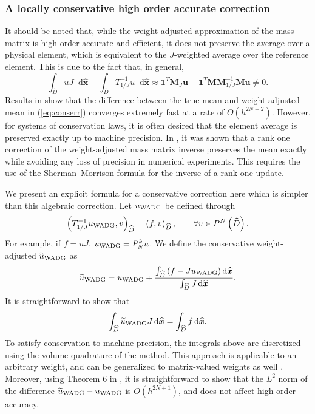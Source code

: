 \documentclass[preprint,10pt]{article}
\theoremstyle{definition}
\theoremstyle{lemma}
\theoremstyle{theorem}
\theoremstyle{assumption}
\renewcommand{\hat}{\widehat}
\renewcommand{\tilde}{\widetilde}
\newcommand{\LRp}[1]{\left( #1 \right)}
\newcommand*\diff[1]{\mathop{}\!{\mathrm{d}#1}} %
\begin{document}
{\subsubsection{A locally conservative high order accurate correction}

It should be noted that, while the weight-adjusted approximation of the mass matrix is high order accurate and efficient, it does not preserve the average over a physical element, which is equivalent to the $J$-weighted average over the reference element.  This is due to the fact that, in general,
\begin{equation}
\int_{\hat{D}}u J \diff{\hat{\bm{x}}} - \int_{\hat{D}} T_{1/J}^{-1}u \diff{\hat{\bm{x}}} \approx \bm{1}^T\bm{M}_J\bm{u} - \bm{1}^T\bm{M}\bm{M}_{1/J}^{-1}\bm{M}\bm{u} \neq 0.  
\label{eq:conserr}
\end{equation}
Results in \cite{chan2016weight1} show that the difference between the true mean and weight-adjusted mean in (\ref{eq:conserr}) converges extremely fast at a rate of $O(h^{2N+2})$.  However, for systems of conservation laws, it is often desired that the element average is preserved exactly up to machine precision.  In \cite{chan2016weight2}, it was shown that a rank one correction of the weight-adjusted mass matrix inverse preserves the mean exactly while avoiding any loss of precision in numerical experiments.  This requires the use of the Sherman--Morrison formula for the inverse of a rank one update.  

We present an explicit formula for a conservative correction here which is simpler than this algebraic correction.  Let $u_{\rm WADG}$ be defined through 
\[
\LRp{T_{1/J}^{-1}u_{\rm WADG},v}_{\hat{D}} = \LRp{f,v}_{\hat{D}}, \qquad \forall v \in P^N\LRp{\hat{D}}.
\]
For example, if $f = u J$, $u_{\rm WADG} = P^k_N u$.  We define the conservative weight-adjusted $\tilde{u}_{\rm WADG}$ as
\[
  \tilde{u}_{\rm WADG} = u_{\rm WADG} + \frac{\int_{\hat{D}} \left(f  - J u_{\rm WADG}\right)\diff{\hat{\bm{x}}}}{\int_{\hat{D}} J \diff{\hat{\bm{x}}}}.  
\]
It is straightforward to show that 
\[
  \int_{\hat{D}}\tilde{u}_{\rm WADG}J \diff{\hat{\bm{x}}} = \int_{\hat{D}} f \diff{\hat{\bm{x}}}.
\]
To satisfy conservation to machine precision, the integrals above are discretized using the volume quadrature of the method.
This approach is applicable to an arbitrary weight, and can be generalized to matrix-valued weights as well \cite{chan2017weight}.  Moreover, using Theorem 6 in \cite{chan2016weight1}, it is straightforward to show that the $L^2$ norm of the difference $\tilde{u}_{\rm WADG} - u_{\rm WADG}$ is $O(h^{2N+1})$, and does not affect high order accuracy.  

}
\end{document}
